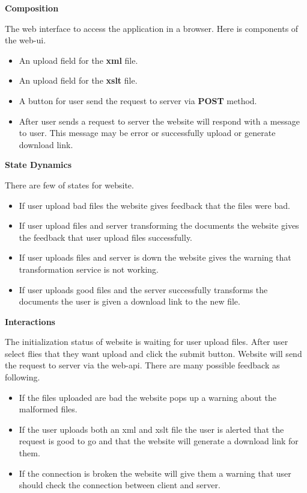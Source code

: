 \textbf{Composition}

The web interface to access the application in a browser.
Here is components of the \gls{web-ui}.

\begin{itemize}
    \item An upload field for the \textbf{\gls{xml}} file.
    \item An upload field for the \textbf{\gls{xslt}} file.
    \item A button for user send the request to server via \textbf{POST} method.
    \item {
       After user sends a request to server the website will respond with a message to user.
        This message may be error or successfully upload or generate download link.
    }
\end{itemize}

\textbf{State Dynamics}

There are few of states for website.

\begin{itemize}
    \item If user upload bad files the website gives feedback that the files were bad.
    \item If user upload files and server transforming the documents the website gives the feedback that user upload files successfully.
    \item If user uploads files and server is down the website gives the warning that transformation service is not working.
    \item If user uploads good files and the server successfully transforms the documents the user is given a download link to the new file.
\end{itemize}

\textbf{Interactions}

The initialization status of website is waiting for user upload files.
After user select flies that they want upload and click the submit button.
Website will send the request to server via the \gls{web-api}.
There are many possible feedback as following.

\begin{itemize}
    \item If the files uploaded are bad the website pops up a warning about the malformed files.
    \item  If the user uploads both an \gls{xml} and \gls{xslt} file the user is alerted that the request is good to go and that the website will generate a download link for them.
    \item If the connection is broken the website will give them a warning that user should check the connection between client and server.
\end{itemize}


